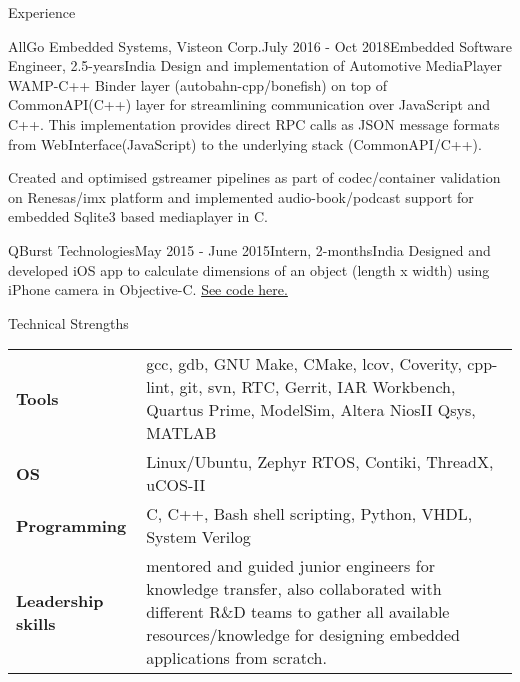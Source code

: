 \documentclass[
	a4paper, %
	11pt, %
]{resume} %
\begin{document}
\begin{rSection}{Experience}
\begin{rSubsection}{AllGo Embedded Systems, Visteon Corp.}{July 2016 - Oct 2018}{Embedded Software Engineer, 2.5-years}{India}
            Design and implementation of Automotive MediaPlayer WAMP-C++ Binder layer (autobahn-cpp/bonefish) on top of CommonAPI(C++) layer for streamlining communication over JavaScript and C++. This implementation provides direct RPC calls as JSON message formats from WebInterface(JavaScript) to the underlying stack (CommonAPI/C++).

            Created and optimised gstreamer pipelines as part of codec/container validation on Renesas/imx platform and implemented audio-book/podcast support for embedded Sqlite3 based mediaplayer in C.

	\end{rSubsection}

	\begin{rSubsection}{QBurst Technologies}{May 2015 - June 2015}{Intern, 2-months}{India}
            Designed and developed iOS app to calculate dimensions of an object (length x width) using iPhone camera in Objective-C.
            \href{https://github.com/sebinsphilip/The\_Dimension\_Tool} {See code here.}

	\end{rSubsection}
 
\end{rSection}


\begin{rSection}{Technical Strengths}

	\begin{tabular}[t]{m{3cm} m{14cm}}
		\textbf{Tools} & gcc, gdb, GNU Make, CMake, lcov, Coverity, cpp-lint, git, svn, RTC, Gerrit, IAR
Workbench, Quartus Prime, ModelSim, Altera NiosII Qsys, MATLAB \\
            \textbf{OS} & Linux/Ubuntu, Zephyr RTOS, Contiki, ThreadX, uCOS-II \\
            \textbf{Programming} & C, C++, Bash shell scripting, Python, VHDL, System Verilog \\
		\textbf{Leadership skills} & mentored and guided junior engineers for knowledge transfer, also collaborated with different R\&D teams to gather all available resources/knowledge for designing embedded applications from scratch.

	\end{tabular}
 
\end{rSection}
\end{document}
